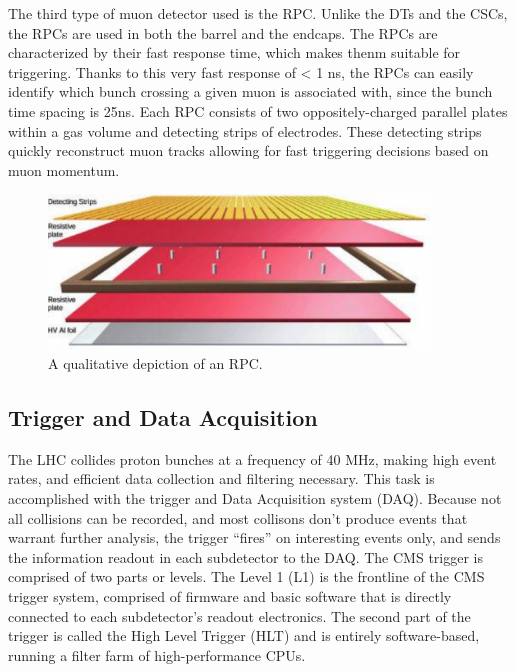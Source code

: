 The third type of muon detector used is the RPC. Unlike the DTs and the CSCs, the RPCs are used in both the barrel and the endcaps. The RPCs are characterized by their fast response time, which makes thenm suitable for triggering.
Thanks to this very fast response of < 1 ns, the RPCs can easily identify which bunch crossing a given muon is associated with, since the bunch time spacing is 25ns.  
Each RPC consists of two oppositely-charged parallel plates within a gas volume and detecting strips of electrodes. These detecting strips quickly reconstruct muon tracks allowing for fast triggering decisions based on muon momentum.  

\begin{figure}[hbtp]
 \begin{center}
   \includegraphics[width=0.9\textwidth]{ch3_figs/cms_rpc.pdf}
   \caption[CMS RPC diagram]{A qualitative depiction of an RPC.}
   \label{fig:cms_rpc}
 \end{center}
\end{figure}
 
\subsection{Trigger and Data Acquisition}

The LHC collides proton bunches at a frequency of 40 MHz, making high event rates, and efficient data collection and filtering necessary. This task is accomplished with the trigger and Data Acquisition system (DAQ). Because not all collisions can be recorded,
and most collisons don't produce events that warrant further analysis, the trigger ``fires'' on interesting events only, and sends the information readout in each subdetector to the DAQ. The CMS trigger is comprised of two parts or levels.
The Level 1 (L1) is the frontline of the CMS trigger system, comprised of firmware and basic software that is directly connected to each subdetector's readout electronics. The second part of the trigger is called the High Level Trigger (HLT)
and is entirely software-based, running a filter farm of high-performance CPUs. 

